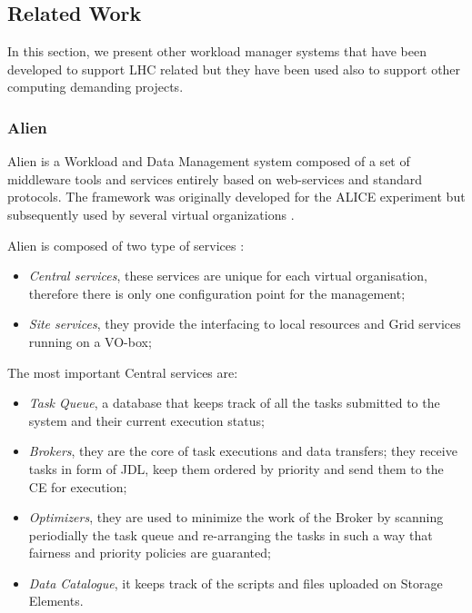 \subsection{Related Work}
\label{sec:related}

In this section, we present other workload manager systems that have been developed to support LHC related but they have been used also to support other computing demanding projects.  




\subsubsection{Alien}
Alien is a Workload and Data Management system composed of a 	set of middleware tools and services entirely based on web-services and standard protocols. The framework was originally developed for the ALICE experiment \cite{Alice1995} but subsequently used by several virtual organizations \cite{McClatechey2003,GPCALMA}. 

Alien is composed of two type of services \cite{Bagnasco2010}:
\begin{itemize}
\item
\emph{Central services}, these services are unique for each virtual organisation, therefore there is only one  configuration point for the management;
\item \emph{Site services}, they provide the interfacing to local resources and Grid services running on a VO-box;
\end{itemize}

The most important Central services are:
\begin{itemize}
\item \emph{Task Queue}, a database that keeps track of all the tasks submitted to the system and their current execution status;
\item \emph{Brokers}, they are the core of task executions and data transfers; they receive tasks in form of JDL,  keep them ordered by priority and send them to the CE for execution;
\item \emph{Optimizers}, they are used to minimize the work of the Broker by scanning periodially the task queue and re-arranging the tasks in such a way that fairness and priority policies are guaranted;
\item \emph{Data Catalogue}, it keeps track of the scripts and files uploaded on Storage Elements.
\end{itemize}

